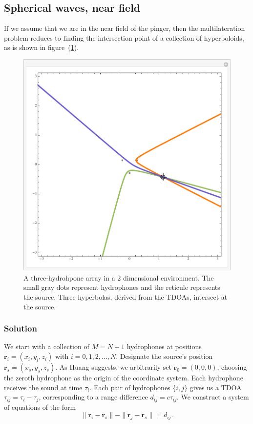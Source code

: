 \documentclass[10pt]{article}
\begin{document}
\subsection{Spherical waves, near field}
\label{sec:near-field}

If we assume that we are in the near field of the pinger, then the multilateration problem reduces to finding the intersection point of a collection of hyperboloids, as is shown in figure~(\ref{fig:hyperbola-good}).

\begin{figure}[htbp]
\begin{center}
\includegraphics[scale=0.5]{hyperbola-good.pdf}
\caption{A three-hydrohpone array in a 2 dimensional environment.  The small gray dots represent hydrophones and the reticule represents the source.  Three hyperbolas, derived from the TDOAs, intersect at the source.}
\label{fig:hyperbola-good}
\end{center}
\end{figure}

\subsubsection{Solution}

We start with a collection of \(M=N+1\) hydrophones at positions \(\mathbf{r}_i=(x_i,y_i,z_i)\) with \(i=0,1,2,\dots,N\).  Designate the source's position \(\mathbf{r}_s=(x_s,y_s,z_s)\).  As Huang \cite{Huang} suggests, we arbitrarily set \(\mathbf{r}_0=(0,0,0)\), choosing the zeroth hydrophone as the origin of the coordinate system.  Each hydrophone receives the sound at time \(\tau_i\).  Each pair of hydrophones \(\{i,j\}\) gives us a TDOA \(\tau_{ij}=\tau_i-\tau_j\), corresponding to a range difference \(d_{ij}=c \tau_{ij}\).  We construct a system of equations of the form
\begin{equation}\label{eq:hyperboloid-ij}
\|\mathbf{r}_i-\mathbf{r}_s\|-\|\mathbf{r}_j-\mathbf{r}_s\|=d_{ij}.
\end{equation}
\end{document}
